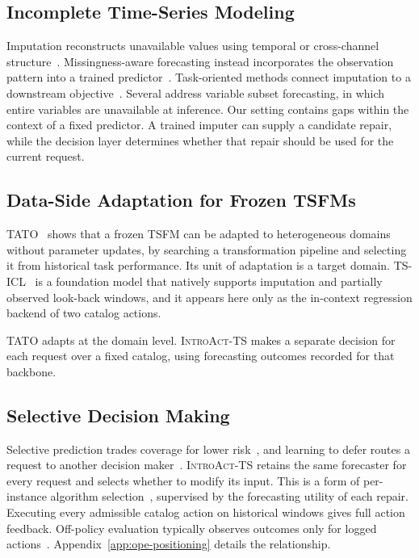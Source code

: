 \documentclass{article}
\newcommand{\introact}{\textsc{IntroAct-TS}}
\newcommand{\tsfm}{TSFM}
\begin{document}
\subsection{Incomplete Time-Series Modeling}
\label{sec:related-incomplete}
Imputation reconstructs unavailable values using temporal or cross-channel
structure~\citep{cao2018brits,tashiro2021csdi,yoon2018gain,du2023saits,park2026t1}.
Missingness-aware forecasting instead incorporates the observation pattern into a trained
predictor~\citep{chen2024bitgraph,peng2025s4m,jang2026channeltokenformer}.
Task-oriented methods connect imputation to a downstream
objective~\citep{wang2024taskoriented,hao2025toivsf,hao2025gimcc,liang2025vida,xu2026srdi}.
Several address variable subset forecasting, in which entire variables are unavailable at
inference. Our setting contains gaps within the context of a fixed predictor. A trained
imputer can supply a candidate repair, while the decision layer determines whether that
repair should be used for the current request.

\subsection{Data-Side Adaptation for Frozen \tsfm{}s}
\label{sec:related-dataside}
TATO~\citep{qiu2026tato} shows that a frozen \tsfm{} can be adapted to heterogeneous domains
without parameter updates, by searching a transformation pipeline and selecting it from
historical task performance. Its unit of adaptation is a target domain.
TS-ICL~\citep{tsicl2026} is a foundation model that natively supports imputation and partially
observed look-back windows, and it appears here only as the in-context regression backend of
two catalog actions.

TATO adapts at the domain level. \introact{} makes a separate decision for each request
over a fixed catalog, using forecasting outcomes recorded for that backbone.

\subsection{Selective Decision Making}
\label{sec:related-selective}
Selective prediction trades coverage for lower
risk~\citep{chow1970optimum,vovk2005algorithmic,geifman2017selective,lei2018distribution},
and learning to defer routes a request to another decision
maker~\citep{madras2018predict,mozannar2020consistent}. \introact{} retains the same forecaster
for every request and selects whether to modify its input. This is a form of per-instance
algorithm selection~\citep{rice1976algorithm,xu2008satzilla}, supervised by the forecasting
utility of each repair. Executing every admissible catalog action on historical windows gives
full action feedback. Off-policy evaluation typically observes outcomes only for logged
actions~\citep{dudik2011doubly,swaminathan2015counterfactual}.
Appendix~\ref{app:ope-positioning} details the relationship.
\end{document}
